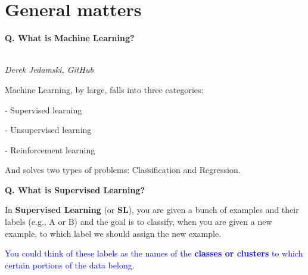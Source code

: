 \section{General matters}
\begin{frame}[fragile]{\textbf{Q. What is Machine Learning?}}
  \begin{wideitemize}
  \item {}\\\hspace{25em}\textit{Derek Jedamski,
      GitHub}
  \item Machine Learning, by large, falls into three categories:\vspace{.4em}
    \begin{wideitemize}
    \item[-] Supervised learning
    \item[-] Unsupervised learning
    \item[-] Reinforcement learning
    \end{wideitemize}
  \item And solves two types of problems: Classification and Regression.
  \end{wideitemize}
\end{frame}

\begin{frame}[fragile]{\textbf{Q. What is Supervised Learning?}}
  \begin{wideitemize}
    \item In \textbf{Supervised Learning} (or \textbf{SL}), you are given a
    bunch of examples and their labels (e.g., A or B) and the goal is to
    classify, when you are given a new example, to which label we
    should assign the new example.
    \item \textcolor{blue}{You could think of these labels as the names of the
    \textbf{classes or clusters} to which certain portions of the data belong.}
  \end{wideitemize}
\end{frame}

